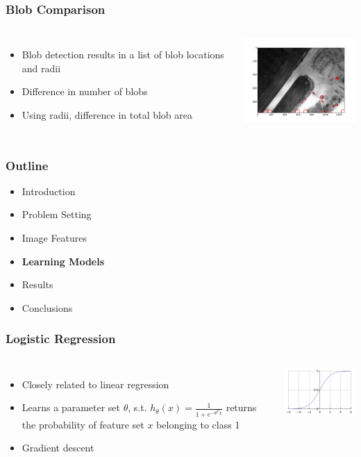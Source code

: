 \documentclass{beamer}
\begin{document}
\begin{frame}
\frametitle{Blob Comparison}
\begin{columns}
  \begin{itemize}
    \item Blob detection results in a list of blob locations and radii
    \item Difference in number of blobs
    \item Using radii, difference in total blob area
  \end{itemize}
  \includegraphics[width = 5cm]{Figures/blobtest}
\end{columns}
\end{frame}


\begin{frame}
\frametitle{Outline}
\begin{itemize}
  \item Introduction
  \item\vspace{0.5cm}Problem Setting
  \item\vspace{0.5cm}Image Features
  \item \vspace{0.5cm} \textbf{Learning Models}
  \item \vspace{0.5cm} Results
  \item \vspace{0.5cm}Conclusions
\end{itemize}
\end{frame}


\begin{frame}
\frametitle{Logistic Regression}
\begin{columns}
  \begin{itemize}
    \item Closely related to linear regression
    \item Learns a parameter set $\theta$, s.t. $h_\theta(x) = \frac{1}{1+e^{-\theta^Tx}}$ returns the probability of feature set $x$ belonging to class 1
    \item Gradient descent
  \end{itemize}
  \includegraphics[width = 5cm]{Figures/logit}
\end{columns}
\end{frame}
\end{document}
